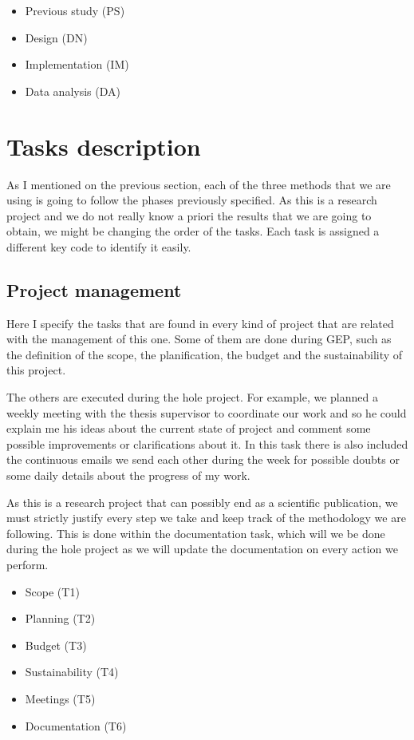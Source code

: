 \documentclass{article}
\begin{document}
\begin{itemize}
    \item Previous study (PS)
    \item Design (DN)
    \item Implementation (IM)
    \item Data analysis (DA)
\end{itemize}


\section{Tasks description}
As I mentioned on the previous section, each of the three methods that we are using is going to follow the phases previously specified. As this is a research project and we do not really know a priori the results that we are going to obtain, we might be changing the order of the tasks.
Each task is assigned a different key code to identify it easily.

\subsection{Project management}
Here I specify the tasks that are found in every kind of project that are related with the management of this one. Some of them are done during GEP, such as the definition of the scope, the planification, the budget and the sustainability of this project. 

The others are executed during the hole project. For example, we planned a weekly meeting with the thesis supervisor to coordinate our work and so he could explain me his ideas about the current state of project and comment some possible improvements or clarifications about it. In this task there is also included the continuous emails we send each other during the week for possible doubts or some daily details about the progress of my work.

As this is a research project that can possibly end as a scientific publication, we must strictly justify every step we take and keep track of the methodology we are following. This is done within the documentation task, which will we be done during the hole project as we will update the documentation on every action we perform.
\begin{itemize}
    \item Scope (T1)
    \item Planning (T2)
    \item Budget (T3)
    \item Sustainability (T4)
    \item Meetings (T5)
    \item Documentation (T6)
\end{itemize}
\end{document}
